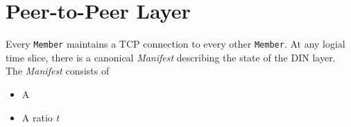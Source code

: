 \section{Peer-to-Peer Layer}
Every \texttt{Member} maintains a TCP connection to every other \texttt{Member}.
At any logial time slice, there is a canonical \emph{Manifest} describing the
state of the DIN layer. The \emph{Manifest} consists of
\begin{itemize}
  \item A
  \item A ratio \emph{t}
\end{itemize}

%
%
%
%
%
